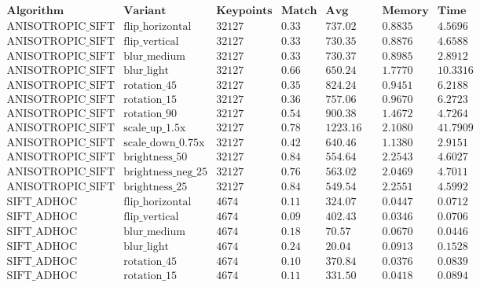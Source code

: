 \documentclass[conference]{IEEEtran}
\begin{document}
$$\begin{array}{|l|l|c|c|c|c|c|}
\hline
\textbf{Algorithm} & \textbf{Variant} & \textbf{Keypoints} & \textbf{Match Ratio} & \textbf{Avg Distance} & \textbf{Memory (MB)} & \textbf{Time (sec)} \\ \hline
\text{ANISOTROPIC\_SIFT} & \text{flip\_horizontal} & 32127 & 0.33 & 737.02 & 0.8835 & 4.5696 \\
\text{ANISOTROPIC\_SIFT} & \text{flip\_vertical} & 32127 & 0.33 & 730.35 & 0.8876 & 4.6588 \\
\text{ANISOTROPIC\_SIFT} & \text{blur\_medium} & 32127 & 0.33 & 730.37 & 0.8985 & 2.8912 \\
\text{ANISOTROPIC\_SIFT} & \text{blur\_light} & 32127 & 0.66 & 650.24 & 1.7770 & 10.3316 \\
\text{ANISOTROPIC\_SIFT} & \text{rotation\_45} & 32127 & 0.35 & 824.24 & 0.9451 & 6.2188 \\
\text{ANISOTROPIC\_SIFT} & \text{rotation\_15} & 32127 & 0.36 & 757.06 & 0.9670 & 6.2723 \\
\text{ANISOTROPIC\_SIFT} & \text{rotation\_90} & 32127 & 0.54 & 900.38 & 1.4672 & 4.7264 \\
\text{ANISOTROPIC\_SIFT} & \text{scale\_up\_1.5x} & 32127 & 0.78 & 1223.16 & 2.1080 & 41.7909 \\
\text{ANISOTROPIC\_SIFT} & \text{scale\_down\_0.75x} & 32127 & 0.42 & 640.46 & 1.1380 & 2.9151 \\
\text{ANISOTROPIC\_SIFT} & \text{brightness\_50} & 32127 & 0.84 & 554.64 & 2.2543 & 4.6027 \\
\text{ANISOTROPIC\_SIFT} & \text{brightness\_neg\_25} & 32127 & 0.76 & 563.02 & 2.0469 & 4.7011 \\
\text{ANISOTROPIC\_SIFT} & \text{brightness\_25} & 32127 & 0.84 & 549.54 & 2.2551 & 4.5992 \\ \hline
\text{SIFT\_ADHOC} & \text{flip\_horizontal} & 4674 & 0.11 & 324.07 & 0.0447 & 0.0712 \\
\text{SIFT\_ADHOC} & \text{flip\_vertical} & 4674 & 0.09 & 402.43 & 0.0346 & 0.0706 \\
\text{SIFT\_ADHOC} & \text{blur\_medium} & 4674 & 0.18 & 70.57 & 0.0670 & 0.0446 \\
\text{SIFT\_ADHOC} & \text{blur\_light} & 4674 & 0.24 & 20.04 & 0.0913 & 0.1528 \\
\text{SIFT\_ADHOC} & \text{rotation\_45} & 4674 & 0.10 & 370.84 & 0.0376 & 0.0839 \\
\text{SIFT\_ADHOC} & \text{rotation\_15} & 4674 & 0.11 & 331.50 & 0.0418 & 0.0894 \\

\end{array}$$
\end{document}
